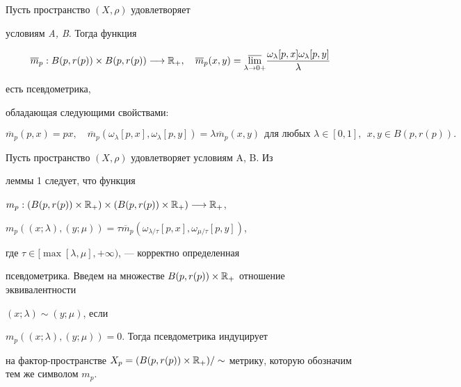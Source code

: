 \begin{lem}


Пусть пространство $(X,\rho)$ удовлетворяет


условиям {\em A, B}. Тогда функция


$$


\overline{m}_{p}: B(p, r(p))\times B(p, r(p))


\longrightarrow {\Bbb R}_{+}, \quad \overline{m}_{p}(x, y)=


\underset{\lambda \to 0+}{\varlimsup}{}{\frac{\omega_{\lambda}[p,


x]\omega_{\lambda}[p, y]}{\lambda}}


$$


есть псевдометрика,


обладающая следующими свойствами\/${:}$


$$


\overline{m}_{p}(p, x)=px,\quad


\overline{m}_{p}(\omega_{\lambda}[p, x],\omega_{\lambda}[p, y])=


\lambda \overline{m}_{p}( x, y)


\ \ \text{для любых $\lambda \in [0, 1]$},


\ \ x, y \in B(p, r(p)).


$$


\end{lem}





Пусть пространство $(X,\rho)$ удовлетворяет условиям A, B. Из


леммы 1 следует, что функция


$m_{p}: (B(p, r(p)) \times {\Bbb R}_{+}) \times (B(p, r(p)) \times


{\Bbb R}_{+}) \longrightarrow {\Bbb R}_{+}$,


$m_{p}((x;\lambda),(y;\mu))=


\tau\overline{m}_{p}(\omega_{\lambda/\tau}[p,x],\omega_{\mu/\tau}[p,y])$,


где $\tau \in [\max[\lambda,\mu],+\infty)$, --- корректно определенная


псевдометрика. Введем на множестве $B(p, r(p)) \times {\Bbb


R}_{+}$ отношение эквивалентности


$(x;\lambda)\sim (y;\mu)$, если


$m_{p}((x;\lambda),(y;\mu))=0$. Тогда псевдометрика индуцирует


на фактор-пространстве  $X_{p}=(B(p, r(p)) \times {\Bbb


R}_{+})/\sim$ метрику, которую обозначим тем же символом $m_{p}$.








